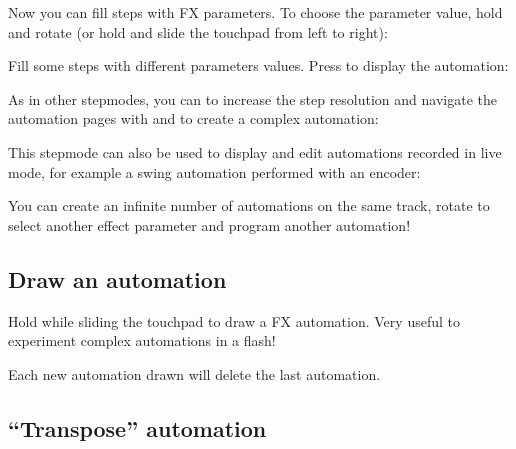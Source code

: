 Now you can fill steps with FX parameters. To choose the parameter value, hold  and rotate \encodericon{} (or hold  and slide the touchpad from left to right):



Fill some steps with different parameters values. Press  to display the automation:




As in other stepmodes, you can  to increase the step resolution and navigate the automation pages with \btn{<} and \btn{>} to create a complex automation:



This stepmode can also be used to display and edit automations recorded in live mode, for example a swing automation performed with an encoder:


You can create an infinite number of automations on the same track, rotate \encodericon{} to select another effect parameter and program another automation!

\subsection{Draw an automation}

Hold  while sliding the touchpad to draw a FX automation. Very useful to experiment complex automations in a flash!

Each new automation drawn will delete the last automation.

\subsection{“Transpose” automation}

